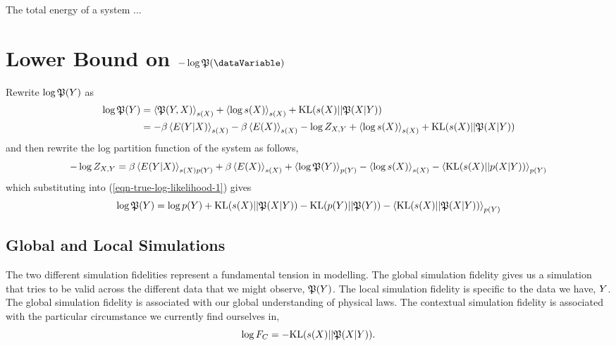 \documentclass[]{article}
\begin{document}
The total energy of a system ...

\section{Lower Bound on $-\log \trueProb(\dataVariable)$} \label{sec-upper-bound-log-prob}

Rewrite $\log \mathfrak{P}(Y)$ as
\begin{align}
    \log \mathfrak{P}(Y) & =
    \left\langle \mathfrak{P}(Y,
      X) \right\rangle_{s(X )} + \left\langle \log
      s(X) \right\rangle_{s(X)} +
    \text{KL}(s(X)||\mathfrak{P}(X|Y))
    \nonumber \\ & = -\beta\left\langle  E(Y |
      X) \right\rangle_{s(X)}
    -\beta\left\langle E(X) \right\rangle_{s(X)} -
    \log Z_{X,Y} + \left\langle \log
      s(X) \right\rangle_{s(X)} +
    \text{KL}(s(X)||\mathfrak{P}(X|Y)) \label{eqn-true-log-likelihood-1}
\end{align}
and then rewrite the log partition function of the system as follows,
\[
- \log Z_{X,Y} =
\beta\left\langle E(Y |
  X) \right\rangle_{s(X)p(Y)}
+ \beta\left\langle E(X) \right\rangle_{s(X )} +
\left\langle \log \mathfrak{P}(Y) \right\rangle_{p(Y)}
-\left\langle \log s(X) \right\rangle_{s(X)} -
\left\langle \text{KL}(s(X) ||
  p(X |
  Y)) \right\rangle_{p(Y)}
\]
which substituting into (\ref{eqn-true-log-likelihood-1}) gives
\[
\log \mathfrak{P}(Y) = \log p(Y) +
\text{KL}(s(X)||\mathfrak{P}(X|Y))
- \text{KL}(p(Y) || \mathfrak{P}(Y))
- \left\langle \text{KL}(s(X) ||
  \mathfrak{P}(X |
  Y)) \right\rangle_{p(Y)}
\]

\subsection{Global and Local Simulations}

The two different simulation fidelities represent a fundamental
tension in modelling. The global simulation fidelity gives us a
simulation that tries to be valid across the different data that we
might observe, $\mathfrak{P}(Y)$. The local simulation
fidelity is specific to the data we have, $Y$. The global
simulation fidelity is associated with our global understanding of
physical laws. The contextual simulation fidelity is associated with
the particular circumstance we currently find ourselves in,
\[
\log F_C =
-\text{KL}(s(X)||\mathfrak{P}(X|Y)).
\]
\end{document}

